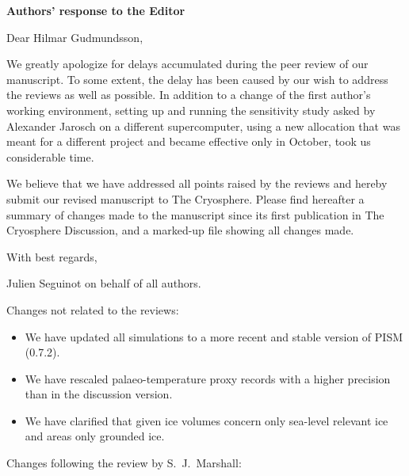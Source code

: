 
\linespread{1.0}


\textbf{Authors' response to the Editor}
\bigskip

Dear Hilmar Gudmundsson,

We greatly apologize for delays accumulated during the peer review of our
manuscript. To some extent, the delay has been caused by our wish to address
the reviews as well as possible. In addition to a change of the first author's
working environment, setting up and running the sensitivity study asked by
Alexander Jarosch on a different supercomputer, using a new allocation that was
meant for a different project and became effective only in October, took us
considerable time.

We believe that we have addressed all points raised by the reviews and hereby
submit our revised manuscript to The Cryosphere. Please find hereafter a
summary of changes made to the manuscript since its first publication in The
Cryosphere Discussion, and a marked-up file showing all changes made.

With best regards,

Julien Seguinot on behalf of all authors.

\bigskip

Changes not related to the reviews:

\begin{itemize}

    \item We have updated all simulations to a more recent and stable version
    of PISM (0.7.2).

    \item We have rescaled palaeo-temperature proxy records with a higher
    precision than in the discussion version.

    \item We have clarified that given ice volumes concern only sea-level
    relevant ice and areas only grounded ice.

\end{itemize}

\bigskip

Changes following the review by S.~J.~Marshall:

